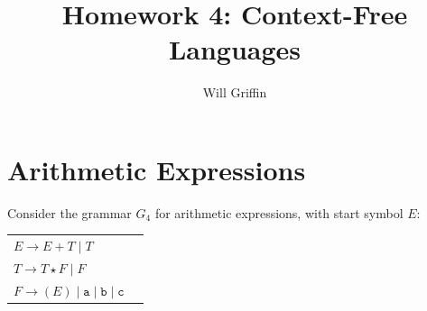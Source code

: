 \documentclass{article}
\title{Homework 4: Context-Free Languages}
\author{Will Griffin}
\begin{document}
    \maketitle

    \section{Arithmetic Expressions}

    Consider the grammar $G_4$ for arithmetic expressions, with start symbol $E$:

        \begin{center}
        \begin{tabular}{ll}
            $E \longrightarrow E + T \mid T$ \\
            $T \longrightarrow T \star F \mid F$ \\
            $F \longrightarrow (E) \mid \texttt{a} \mid \texttt{b} \mid \texttt{c}$
        \end{tabular}
        \end{center}
\end{document}
